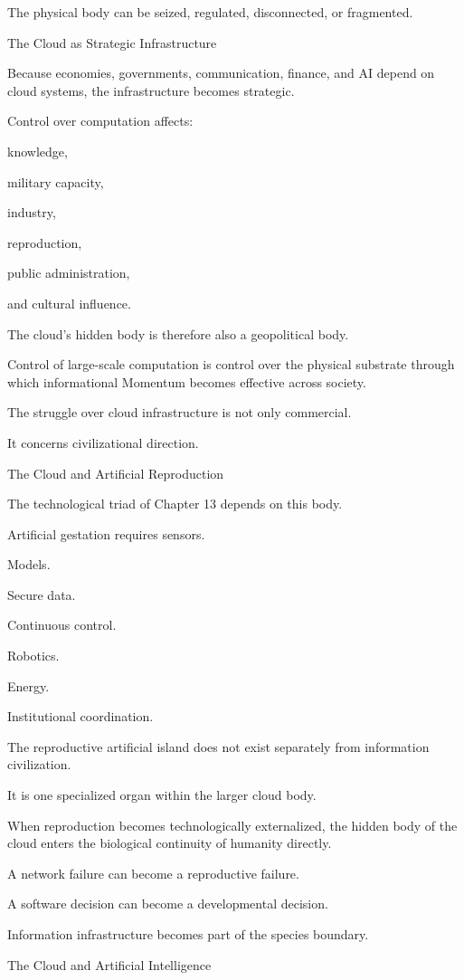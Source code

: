 The physical body can be seized, regulated, disconnected, or fragmented.

The Cloud as Strategic Infrastructure

Because economies, governments, communication, finance, and AI depend on cloud systems, the infrastructure becomes strategic.

Control over computation affects:

knowledge,

military capacity,

industry,

reproduction,

public administration,

and cultural influence.

The cloud’s hidden body is therefore also a geopolitical body.

Control of large-scale computation is control over the physical substrate through which informational Momentum becomes effective across society.

The struggle over cloud infrastructure is not only commercial.

It concerns civilizational direction.

The Cloud and Artificial Reproduction

The technological triad of Chapter 13 depends on this body.

Artificial gestation requires sensors.

Models.

Secure data.

Continuous control.

Robotics.

Energy.

Institutional coordination.

The reproductive artificial island does not exist separately from information civilization.

It is one specialized organ within the larger cloud body.

When reproduction becomes technologically externalized, the hidden body of the cloud enters the biological continuity of humanity directly.

A network failure can become a reproductive failure.

A software decision can become a developmental decision.

Information infrastructure becomes part of the species boundary.

The Cloud and Artificial Intelligence

